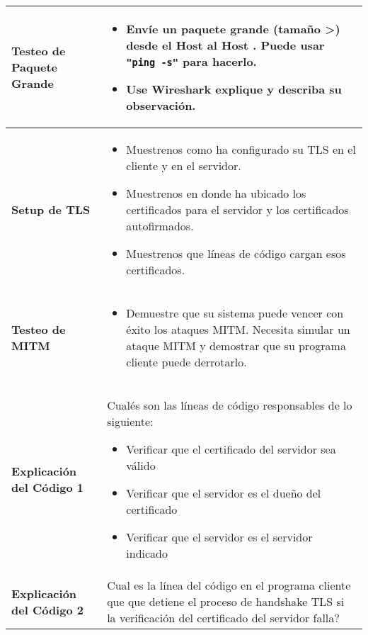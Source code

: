 \begin{longtable}{|p{}|p{}|}
 \textbf{Testeo de Paquete Grande} & 
 	\vspace*{-0.3cm}
 	\begin{itemize}[topsep=-0.5cm,leftmargin=0.4cm]
 	\item Envíe un paquete grande (tamaño \textgreater\space 3000) desde el Host \hostu al Host \hostv. Puede usar \texttt{"ping -s"} para hacerlo.

	\item Use Wireshark explique y describa su observación.
	\end{itemize}
 \\ 
 \hline

 \textbf{Setup de TLS} & 
 	\vspace*{-0.3cm}
 	\begin{itemize}[topsep=-0.5cm,leftmargin=0.4cm]
 		\item Muestrenos como ha configurado su TLS en el cliente y en el servidor.
 		\item Muestrenos en donde ha ubicado los certificados para el servidor y los certificados autofirmados.
 		\item Muestrenos que líneas de código cargan esos certificados.
	\end{itemize}
 \\ 
 \hline

 \textbf{Testeo de MITM} & 
 	\vspace*{-0.3cm}
 	\begin{itemize}[topsep=-0.5cm,leftmargin=0.4cm]
 		\item Demuestre que su sistema puede vencer con éxito los ataques MITM. Necesita simular un ataque MITM y demostrar que su programa cliente puede derrotarlo.
	\end{itemize}
 \\ 
 \hline

 \textbf{Explicación del Código 1} & 
	Cualés son las líneas de código responsables de lo siguiente:
 	\vspace*{0.2cm}
 	\begin{itemize}[topsep=-0.5cm,leftmargin=0.4cm]
 		\item Verificar que el certificado del servidor sea válido
 		\item Verificar que el servidor es el dueño del certificado
 		\item Verificar que el servidor es el servidor indicado
	\end{itemize}
 \\ 
 \hline

 \textbf{Explicación del Código 2} & 
 	Cual es la línea del código en el programa cliente que que detiene el proceso  de handshake TLS  si la verificación del certificado del servidor falla?
 \\ 
 \hline


\end{longtable}
